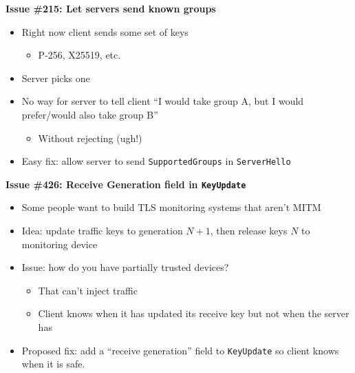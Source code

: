 \documentclass[helvetica]{seminar}
\newcommand{\heading}[1]{%
  \begin{center} 
    \large\bf 
    #1 
  \end{center} 
  \vspace{.4 in}}
\begin{document}
\begin{slide}
\heading{Issue \#215: Let servers send known groups}

\begin{itemize}
\item Right now client sends some set of keys
  \begin{itemize}
  \item P-256, X25519, etc.
  \end{itemize}

\item Server picks one
\item No way for server to tell client ``I would take group A, but I would prefer/would also take group B''
  \begin{itemize}
  \item Without rejecting (ugh!)
  \end{itemize}

\item Easy fix: allow server to send \verb^SupportedGroups^ in \verb^ServerHello^
\end{itemize}
\end{slide}


\begin{slide}
\heading{Issue \#426: Receive Generation field in \texttt{KeyUpdate}}

\begin{itemize}
\item Some people want to build TLS monitoring systems that aren't MITM
\item Idea: update traffic keys to generation $N+1$, then release keys $N$ to monitoring device
\item Issue: how do you have partially trusted devices?
  \begin{itemize}
  \item That can't inject traffic
  \item Client knows when it has updated its receive key but not when the server has
  \end{itemize}
\item Proposed fix: add a ``receive generation'' field to \verb^KeyUpdate^ so client knows when it is safe.
\end{itemize}

\end{slide}
\end{document}
